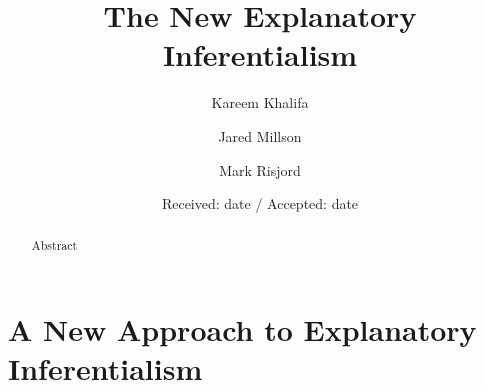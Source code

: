 \documentclass{svjour3}                     %
\begin{document}
\title{The New Explanatory Inferentialism%
}


\author{Kareem Khalifa        \and
        Jared Millson				\and
        Mark Risjord
}



\date{Received: date / Accepted: date}
\raggedbottom

\maketitle

\begin{abstract}
Abstract
\end{abstract}




\section{A New Approach to Explanatory Inferentialism}
\label{kernel}
\end{document}
